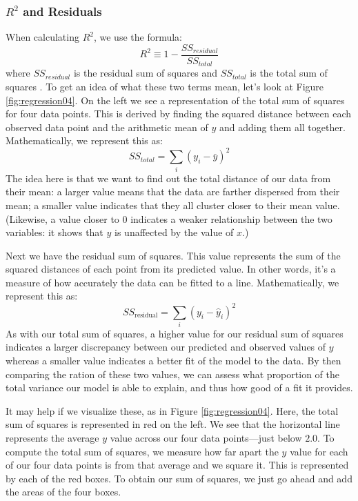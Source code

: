\subsubsection{$R^2$ and Residuals}
When calculating $R^2$, we use the formula:
\begin{equation}
R^2 \equiv 1-\frac{SS_{residual}}{SS_{total}}
\end{equation}
where $SS_{residual}$ is the residual sum of squares  and $SS_{total}$ is the total sum of squares . To get an idea of what these two terms mean, let's look at Figure \ref{fig:regression04}. On the left we see a representation of the total sum of squares for four data points. This is derived by finding the squared distance between each observed data point and the arithmetic mean of $y$ and adding them all together. Mathematically, we represent this as:
\begin{equation*}
SS_{total} =\sum_i \left(y_i-\bar{y}\right)^2
\end{equation*}
The idea here is that we want to find out the total distance of our data from their mean: a larger value means that the data are farther dispersed from their mean; a smaller value indicates that they all cluster closer to their mean value. (Likewise, a value closer to 0 indicates a weaker relationship between the two variables: it shows that $y$ is unaffected by the value of $x$.)

Next we have the residual sum of squares. This value represents the sum of the squared distances of each point from its predicted value. In other words, it's a measure of how accurately the data can be fitted to a line. Mathematically, we represent this as:
\begin{equation*}
SS_\text{residual}=\sum_i \left(y_i - \hat{y}_i\right)^2
\end{equation*}
As with our total sum of squares, a higher value for our residual sum of squares indicates a larger discrepancy between our predicted and observed values of $y$ whereas a smaller value indicates a better fit of the model to the data. By then comparing the ration of these two values, we can assess what proportion of the total variance our model is able to explain, and thus how good of a fit it provides.

It may help if we visualize these, as in Figure \ref{fig:regression04}. Here, the total sum of squares is represented in red on the left.  We see that the horizontal line represents the average $y$ value across our four data points---just below $2.0$. To compute the total sum of squares, we measure how far apart the $y$ value for each of our four data points is from that average and we square it. This is represented by each of the red boxes. To obtain our sum of squares, we just go ahead and add the areas of the four boxes.

